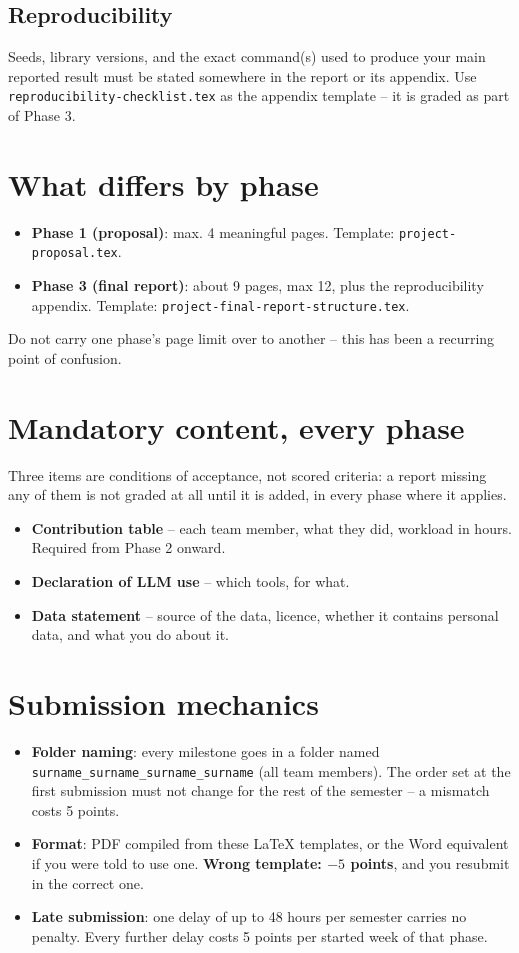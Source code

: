 \documentclass[11pt]{article}
\begin{document}
\subsection{Reproducibility}
Seeds, library versions, and the exact command(s) used to produce your main reported result must be stated somewhere in the report or its appendix. Use \texttt{reproducibility-checklist.tex} as the appendix template -- it is graded as part of Phase 3.

\section{What differs by phase}

\begin{itemize}
\item \textbf{Phase 1 (proposal)}: max. 4 meaningful pages. Template: \texttt{project-proposal.tex}.
\item \textbf{Phase 3 (final report)}: about 9 pages, max 12, plus the reproducibility appendix. Template: \texttt{project-final-report-structure.tex}.
\end{itemize}
Do not carry one phase's page limit over to another -- this has been a recurring point of confusion.

\section{Mandatory content, every phase}

Three items are conditions of acceptance, not scored criteria: a report missing any of them is not graded at all until it is added, in every phase where it applies.
\begin{itemize}
\item \textbf{Contribution table} -- each team member, what they did, workload in hours. Required from Phase 2 onward.
\item \textbf{Declaration of LLM use} -- which tools, for what.
\item \textbf{Data statement} -- source of the data, licence, whether it contains personal data, and what you do about it.
\end{itemize}

\section{Submission mechanics}

\begin{itemize}
\item \textbf{Folder naming}: every milestone goes in a folder named \texttt{surname\_surname\_surname\_surname} (all team members). The order set at the first submission must not change for the rest of the semester -- a mismatch costs 5 points.
\item \textbf{Format}: PDF compiled from these LaTeX templates, or the Word equivalent if you were told to use one. \textbf{Wrong template: $-5$ points}, and you resubmit in the correct one.
\item \textbf{Late submission}: one delay of up to 48 hours per semester carries no penalty. Every further delay costs 5 points per started week of that phase.
\end{itemize}
\end{document}
